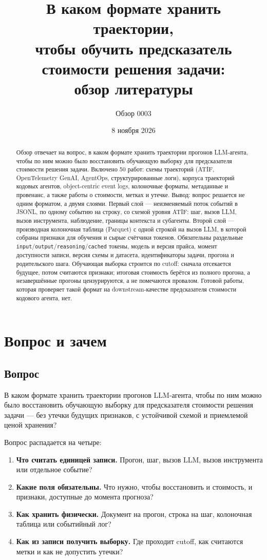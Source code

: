 \documentclass[11pt,a4paper]{article}
\title{В каком формате хранить траектории,\\
чтобы обучить предсказатель стоимости решения задачи:\\
обзор литературы}
\author{Обзор 0003}
\date{8 ноября 2026}
\begin{document}
\maketitle

\begin{abstract}
\noindent
Обзор отвечает на вопрос, в каком формате хранить траектории прогонов
LLM-агента, чтобы по ним можно было восстановить обучающую выборку для
предсказателя стоимости решения задачи. Включено 50 работ: схемы траекторий
(ATIF, OpenTelemetry GenAI, AgentOps, структурированные логи), корпуса
траекторий кодовых агентов, object-centric event logs, колоночные форматы,
метаданные и провенанс, а также работы о стоимости, метках и утечке.
Вывод: вопрос решается не одним форматом, а двумя слоями. Первый слой —
неизменяемый поток событий в JSONL, по одному событию на строку, со схемой
уровня ATIF: шаг, вызов LLM, вызов инструмента, наблюдение, границы
контекста и субагенты. Второй слой — производная колоночная таблица
(Parquet) с одной строкой на вызов LLM, в которой собраны признаки для
обучения и сырые счётчики токенов. Обязательны раздельные
\texttt{input}/\texttt{output}/\texttt{reasoning}/\texttt{cached} токены,
модель и версия прайса, момент доступности записи, версия схемы и датасета,
идентификаторы задачи, прогона и родительского шага. Обучающая выборка
строится по cutoff: сначала отсекается будущее, потом считаются признаки;
итоговая стоимость берётся из полного прогона, а незавершённые прогоны
цензурируются, а не помечаются провалом. Готовой работы, которая проверяет
такой формат на downstream-качестве предсказателя стоимости кодового
агента, нет.
\end{abstract}

\section{Вопрос и зачем}

\subsection{Вопрос}

В каком формате хранить траектории прогонов LLM-агента, чтобы по ним можно
было восстановить обучающую выборку для предсказателя стоимости решения
задачи — без утечки будущих признаков, с устойчивой схемой и приемлемой
ценой хранения?

Вопрос распадается на четыре:

\begin{enumerate}
  \item \textbf{Что считать единицей записи.} Прогон, шаг, вызов LLM,
        вызов инструмента или отдельное событие?
  \item \textbf{Какие поля обязательны.} Что нужно, чтобы восстановить и
        стоимость, и признаки, доступные до момента прогноза?
  \item \textbf{Как хранить физически.} Документ на прогон, строка на шаг,
        колоночная таблица или событийный лог?
  \item \textbf{Как из записи получить выборку.} Где проходит cutoff, как
        считаются метки и как не допустить утечки?
\end{enumerate}
\end{document}
